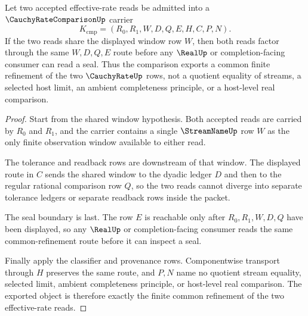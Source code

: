 \begin{theorem}
\label{thm:cauchy-rate-comparison-common-refinement}
Let two accepted effective-rate reads be admitted into a $\CauchyRateComparisonUp$ carrier
$$
K_{\mathrm{cmp}}=(R_0,R_1,W,D,Q,E,H,C,P,N).
$$
If the two reads share the displayed window row $W$, then both reads factor through the same $W,D,Q,E$ route before any $\RealUp$ or completion-facing consumer can read a seal. Thus the comparison exports a common finite refinement of the two $\CauchyRateUp$ rows, not a quotient equality of streams, a selected host limit, an ambient completeness principle, or a host-level real comparison.
\end{theorem}
\begin{proof}
Start from the shared window hypothesis. Both accepted reads are carried by $R_0$ and $R_1$, and the carrier contains a single $\StreamNameUp$ row $W$ as the only finite observation window available to either read.

The tolerance and readback rows are downstream of that window. The displayed route in $C$ sends the shared window to the dyadic ledger $D$ and then to the regular rational comparison row $Q$, so the two reads cannot diverge into separate tolerance ledgers or separate readback rows inside the packet.

The seal boundary is last. The row $E$ is reachable only after $R_0,R_1,W,D,Q$ have been displayed, so any $\RealUp$ or completion-facing consumer reads the same common-refinement route before it can inspect a seal.

Finally apply the classifier and provenance rows. Componentwise transport through $H$ preserves the same route, and $P,N$ name no quotient stream equality, selected limit, ambient completeness principle, or host-level real comparison. The exported object is therefore exactly the finite common refinement of the two effective-rate reads.
\end{proof}


